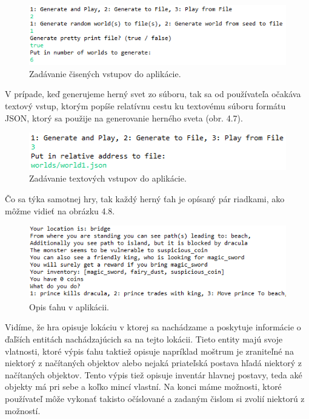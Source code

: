 \begin{figure}[H] 
\begin{center}
\includegraphics[scale=1.2]{img/menu4.png}
\caption{Zadávanie čisených vstupov do aplikácie.}
\label{fig:ch46}
\end{center}
\end{figure}
V prípade, keď generujeme herný svet zo súboru, tak sa od používateľa očakáva textový vstup, ktorým popíše relatívnu cestu ku textovému súboru formátu JSON, ktorý sa použije na generovanie herného sveta (obr. 4.7).
\begin{figure}[H] 
\begin{center}
\includegraphics[scale=1.2]{img/menu5.png}
\caption{Zadávanie textových vstupov do aplikácie.}
\label{fig:ch47}
\end{center}
\end{figure}
Čo sa týka samotnej hry, tak každý herný ťah je opísaný pár riadkami, ako môžme vidieť na obrázku 4.8.
\begin{figure}[H] 
\begin{center}
\includegraphics[scale=1.2]{img/turn.png}
\caption{Opis ťahu v aplikácii.}
\label{fig:ch48}
\end{center}
\end{figure}
Vidíme, že hra opisuje lokáciu v ktorej sa nachádzame a poskytuje informácie o ďaľších entitách nachádzajúcich sa na tejto lokácii. Tieto entity majú svoje vlatnosti, ktoré výpis ťahu taktiež opisuje napríklad moštrum je zraniteľné na niektorý z načítaných objektov alebo nejaká priateľská postava hľadá niektorý z načítaných objektov. Tento výpis tiež opisuje inventár hlavnej postavy, teda aké objekty má pri sebe a koľko mincí vlastní. Na konci máme možnosti, ktoré používateľ môže vykonať takisto očíslované a zadaným čislom si zvolií niektorú z možností.